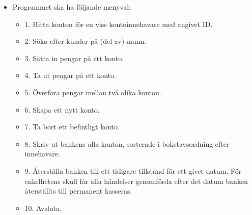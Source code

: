 \begin{itemize}
\item Programmet ska ha följande menyval:

\begin{itemize}
\item 1. Hitta konton för en viss kontoinnehavare med angivet ID.
\item 2. Söka efter kunder på (del av) namn.
\item 3. Sätta in pengar på ett konto.
\item 4. Ta ut pengar på ett konto.
\item 5. Överföra pengar mellan två olika konton.
\item 6. Skapa ett nytt konto.
\item 7. Ta bort ett befintligt konto.
\item 8. Skriv ut bankens alla konton, sorterade i bokstavsordning efter innehavare.
\item 9. Återställa banken till ett tidigare tillstånd för ett givet datum. För enkelhetens skull får alla händelser genomförda efter det datum banken återställts till permanent kasseras.
\item 10. Avsluta.
\end{itemize}


\end{itemize}
